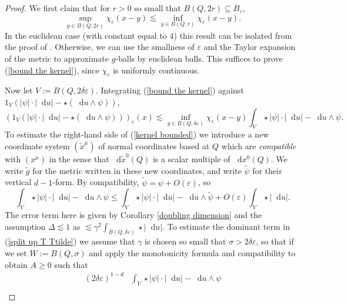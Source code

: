 \documentclass[reqno,10pt]{amsart}
\newcommand*\dif{\mathop{}\!\mathrm{d}}
\newcommand{\dfn}[1]{\emph{#1}\index{#1}}
\theoremstyle{definition}
\numberwithin{equation}{section}
\begin{document}
\begin{proof}
We first claim that for $r > 0$ so small that $B(Q, 2r) \subseteq B_\varepsilon$,
\begin{equation}\label{bound the kernel}
\sup_{y \in B(Q, 2r)} \chi_\varepsilon(x - y) \lesssim \inf_{y \in B(Q, r)} \chi_\varepsilon(x - y).
\end{equation}
In the euclidean case (with constant equal to $4$) this result can be isolated from the proof of \cite[Theorem 7.3]{Giusti77}.
Otherwise, we can use the smallness of $\varepsilon$ and the Taylor expansion of the metric to approximate $g$-balls by euclidean balls.
This suffices to prove (\ref{bound the kernel}), since $\chi_\varepsilon$ is uniformly continuous.

Now let $V := B(Q, 2\delta\varepsilon)$.
Integrating (\ref{bound the kernel}) against $1_V(|\psi| \cdot |\dif u| - \star(\dif u \wedge \psi))$,
\begin{equation}\label{kernel bounded}
(1_V(|\psi| \cdot |\dif u| - \star(\dif u \wedge \psi)))_\varepsilon(x) \lesssim \inf_{y \in B(Q, \delta\varepsilon)} \chi_\varepsilon(x - y) \int_V \star |\psi| \cdot |\dif u| - \dif u \wedge \psi.
\end{equation}
To estimate the right-hand side of (\ref{kernel bounded}) we introduce a new coordinate system $(\tilde x^\mu)$ of normal coordinates based at $Q$ which are \dfn{compatible} with $(x^\mu)$ in the sense that $\dif \tilde x^0(Q)$ is a scalar multiple of $\dif x^0(Q)$.
We write $\tilde g$ for the metric written in these new coordinates, and write $\tilde \psi$ for their vertical $d-1$-form.
By compatibility, $\tilde \psi = \psi + O(\varepsilon)$, so
\begin{equation}\label{split up T Ttilde}
\int_V \star |\psi| \cdot |\dif u| - \dif u \wedge \psi \leq \int_V \star |\psi| \cdot |\dif u| - \dif u \wedge \tilde \psi + O(\varepsilon) \int_V \star |\dif u|.
\end{equation}
The error term here is given by Corollary \ref{doubling dimension} and the assumption $\Delta \lesssim 1$ as $\lesssim \gamma^2 \int_{B(Q, \delta\varepsilon)} \star |\dif u|$.
To estimate the dominant term in (\ref{split up T Ttilde}) we assume that $\gamma$ is chosen so small that $\sigma > 2\delta\varepsilon$, so that if we set $W := B(Q, \sigma)$ and apply the monotonicity formula and compatibility to obtain $A \geq 0$ such that
\begin{align*}
(2\delta\varepsilon)^{1 - d} &\int_V \star |\psi| \cdot |\dif u| - \dif u \wedge \psi \\

\end{align*}
\end{proof}
\end{document}
